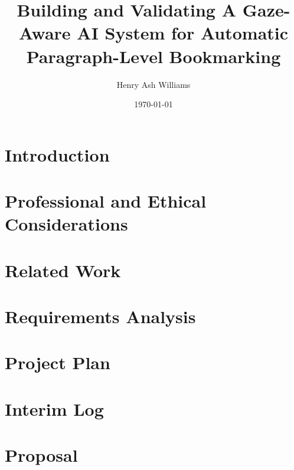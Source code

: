 \documentclass{report}
\title{Building and Validating A Gaze-Aware AI System for Automatic Paragraph-Level Bookmarking}
\author{Henry Ash Williams}
\date{\today}
\begin{document}
\maketitle
\tableofcontents

\chapter{Introduction}




\chapter{Professional and Ethical Considerations}

\chapter{Related Work}

\chapter{Requirements Analysis}
\chapter{Project Plan}
\chapter{Interim Log}
\chapter{Proposal}

\printbibliography
\end{document}

